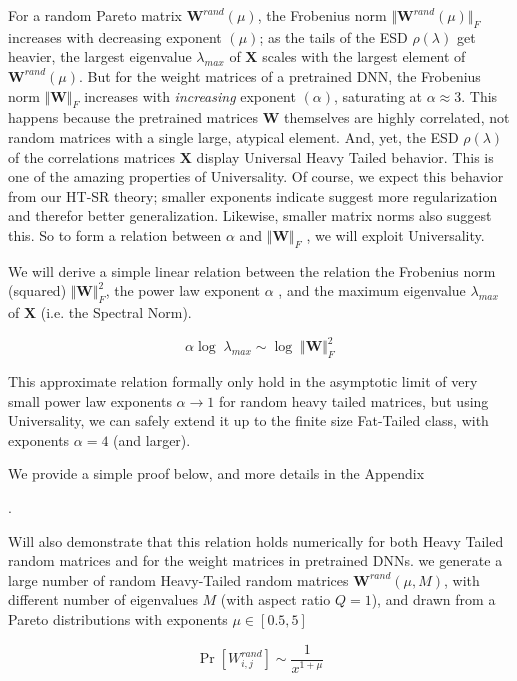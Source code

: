 { For a random Pareto matrix $\mathbf{W}^{rand}(\mu)$,  the Frobenius norm  $\Vert\mathbf{W}^{rand}(\mu)\Vert_{F}$ increases with 
 decreasing exponent $(\mu)$;  as the tails of the ESD $\rho(\lambda)$ get heavier, the largest eigenvalue $\lambda_{max}$ of $\mathbf{X}$
  scales with the largest element of  $\mathbf{W}^{rand}(\mu)$.  But for the weight matrices of a pretrained DNN,
  the Frobenius norm $\Vert\mathbf{W}\Vert_{F}$ increases with \emph{increasing} exponent $(\alpha)$, saturating at $\alpha\approx 3$.
  This happens because the pretrained matrices  $\mathbf{W}$ themselves are highly correlated, not random matrices
  with a single large, atypical element.   And, yet, the ESD $\rho(\lambda)$ of the correlations matrices $\mathbf{X}$ display
  Universal Heavy Tailed behavior. This is one of the amazing properties of Universality.
  Of course, we expect this behavior from our  HT-SR theory; smaller exponents indicate suggest more regularization
  and therefor better generalization.  Likewise, smaller matrix norms also suggest this.  
  So to form a relation between $\alpha$ and  $\Vert\mathbf{W}\Vert_{F}$ , we will exploit Universality.  

We will derive a simple linear relation between the relation the Frobenius norm (squared) $\Vert\mathbf{W}\Vert^{2}_{F}$, the
power law exponent  $\alpha$ , and the maximum eigenvalue $\lambda_{max}$ of $\mathbf{X}$ (i.e. the Spectral Norm).  

$$\alpha\log\;\lambda_{max}\sim\log\;\Vert\mathbf{W}\Vert^{2}_{F}$$

This approximate relation formally only hold in the asymptotic limit of very small power law exponents $\alpha\rightarrow 1$ for
random heavy tailed matrices, but using Universality, we can safely extend it up to the finite size Fat-Tailed class, with
exponents $\alpha=4$ (and larger).  

We provide a simple proof below, and more details in the Appendix}.

Will also demonstrate that this relation holds numerically for both Heavy Tailed random matrices and for 
the weight matrices in pretrained DNNs.
  we generate a large number of random Heavy-Tailed random matrices $\mathbf{W}^{rand}(\mu,M)$, 
with different number of eigenvalues $M$ (with aspect ratio $Q=1$), 
and drawn from a Pareto distributions with exponents $\mu\in[0.5, 5]$

$$\Pr[{W}^{rand}_{i,j}]\sim\dfrac{1}{x^{1+\mu}}$$


